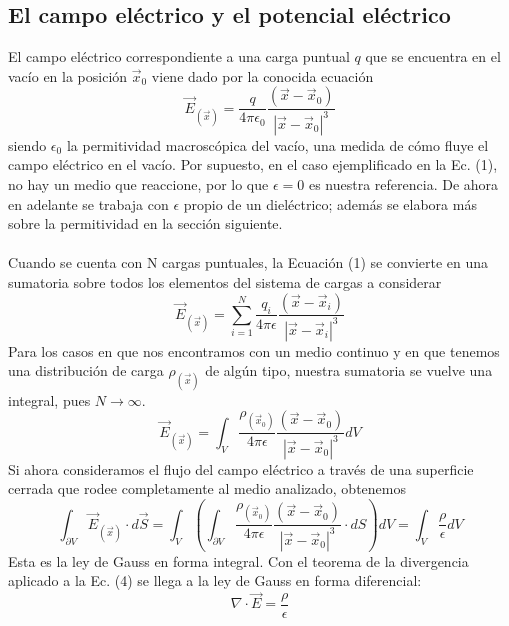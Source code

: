 \documentclass[12pt, notitlepage]{article}
\begin{document}
\subsection{El campo eléctrico y el potencial eléctrico}
El campo eléctrico correspondiente a una carga puntual $q$ que se encuentra en el vacío en la posición $\vec{x}_0$ viene dado por la conocida ecuación
\begin{equation}
\vec{E}_{(\vec{x})} = \frac{q}{4\pi\epsilon_0}\frac{(\vec{x} - \vec{x}_0)}{|\vec{x}-\vec{x}_0|^3}
\end{equation}
siendo $\epsilon_0$ la permitividad macroscópica del vacío, una medida de cómo fluye el campo eléctrico en el vacío. Por supuesto, en el caso ejemplificado en la Ec. (1), no hay un medio que reaccione, por lo que $\epsilon=0$ es nuestra referencia. De ahora en adelante se trabaja con $\epsilon$ propio de un dieléctrico; además se elabora más sobre la permitividad en la sección siguiente.\\\\
Cuando se cuenta con N cargas puntuales, la Ecuación (1) se convierte en una sumatoria sobre todos los elementos del sistema de cargas a considerar
\begin{equation}
\vec{E}_{(\vec{x})} = \sum_{i=1}^N\frac{q_i}{4\pi\epsilon}\frac{(\vec{x} - \vec{x}_i)}{|\vec{x}-\vec{x}_i|^3}
\end{equation}
Para los casos en que nos encontramos con un medio  continuo y en que tenemos una distribución de carga $\rho_{(\vec{x})}$ de algún tipo, nuestra sumatoria se vuelve una integral, pues $N\rightarrow \infty$.
\begin{equation}
\vec{E}_{(\vec{x})} = \int_V\frac{\rho_{(\vec{x}_0)}}{4\pi\epsilon}\frac{(\vec{x} - \vec{x}_0)}{|\vec{x}-\vec{x}_0|^3} dV
\end{equation}
Si ahora consideramos el flujo del campo eléctrico a través de una superficie cerrada que rodee completamente al medio analizado, obtenemos
\begin{equation}
\int_{\partial V}\vec{E}_{(\vec{x})}\cdot d\vec{S} = \int_V\left(\int_{\partial V}\frac{\rho_{(\vec{x}_0)}}{4\pi\epsilon}\frac{(\vec{x} - \vec{x}_0)}{|\vec{x}-\vec{x}_0|^3}\cdot dS\right)dV = \int_V \frac{\rho}{\epsilon} dV
\end{equation}
Esta es la ley de Gauss en forma integral. Con el teorema de la divergencia aplicado a la Ec. (4) se llega a la ley de Gauss en forma diferencial:
\begin{equation}
\nabla\cdot\vec{E} = \frac{\rho}{\epsilon}
\end{equation}
\end{document}

